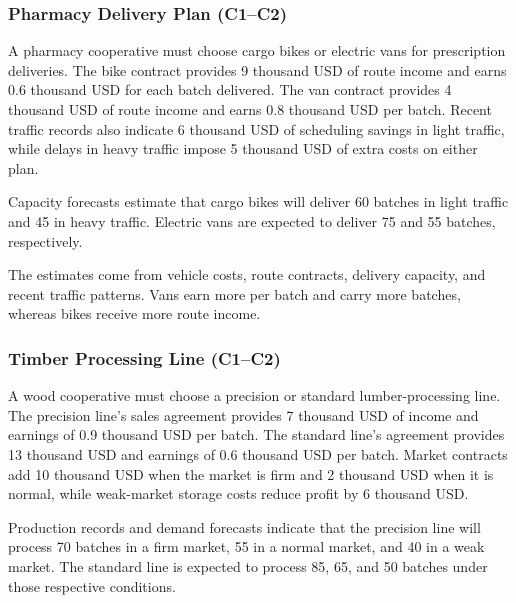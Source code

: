 

	\subsubsection{Pharmacy Delivery Plan (C1--C2)}
	\label{sec:problem30-pharmacy-delivery-plan-c1-c2}
	
	A pharmacy cooperative must choose cargo bikes or electric vans for prescription deliveries. The bike contract provides 9 thousand USD of route income and earns 0.6 thousand USD for each batch delivered. The van contract provides 4 thousand USD of route income and earns 0.8 thousand USD per batch. Recent traffic records also indicate 6 thousand USD of scheduling savings in light traffic, while delays in heavy traffic impose 5 thousand USD of extra costs on either plan.
	
	Capacity forecasts estimate that cargo bikes will deliver 60 batches in light traffic and 45 in heavy traffic. Electric vans are expected to deliver 75 and 55 batches, respectively.
	
	The estimates come from vehicle costs, route contracts, delivery capacity, and recent traffic patterns. Vans earn more per batch and carry more batches, whereas bikes receive more route income.
	
	\subsubsection{Timber Processing Line (C1--C2)}
	\label{sec:problem31-timber-processing-line-c1-c2}
	
	A wood cooperative must choose a precision or standard lumber-processing line. The precision line’s sales agreement provides 7 thousand USD of income and earnings of 0.9 thousand USD per batch. The standard line’s agreement provides 13 thousand USD and earnings of 0.6 thousand USD per batch. Market contracts add 10 thousand USD when the market is firm and 2 thousand USD when it is normal, while weak-market storage costs reduce profit by 6 thousand USD.
	
	Production records and demand forecasts indicate that the precision line will process 70 batches in a firm market, 55 in a normal market, and 40 in a weak market. The standard line is expected to process 85, 65, and 50 batches under those respective conditions.
	
